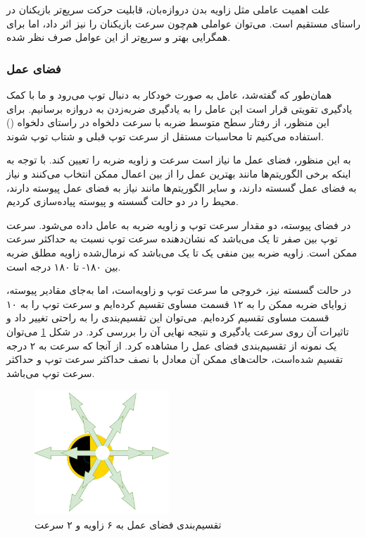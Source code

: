 علت اهمیت عاملی مثل زاویه بدن دروازه‌بان، قابلیت حرکت سریع‌تر بازیکنان در راستای مستقیم است. می‌توان عواملی هم‌چون سرعت بازیکنان را نیز اثر داد،
اما برای همگرایی بهتر و سریع‌تر از این عوامل صرف نظر شده.
\subsubsection{فضای عمل}
همان‌طور که گفته‌شد، عامل به صورت خودکار به دنبال توپ می‌رود و ما با کمک یادگیری تقویتی قرار است این عامل را به یادگیری ضربه‌زدن به دروازه برسانیم.
برای این منظور، از رفتار سطح متوسط ضربه با سرعت دلخواه در راستای دلخواه ()
 استفاده می‌کنیم تا محاسبات مستقل از سرعت توپ قبلی و شتاب توپ شوند.

 به این منظور، فضای عمل ما نیاز است سرعت و زاویه ضربه را تعیین کند.
 با توجه به اینکه برخی الگوریتم‌ها مانند  بهترین عمل را از بین اعمال ممکن انتخاب می‌کنند و نیاز به فضای عمل گسسته دارند،
و سایر الگوریتم‌ها مانند  نیاز به فضای عمل پیوسته دارند،
محیط را در دو حالت گسسته و پیوسته پیاده‌سازی کردیم.

در فضای پیوسته، دو مقدار سرعت توپ و زاویه ضربه به عامل داده می‌شود.
سرعت توپ بین صفر تا یک می‌باشد که نشان‌دهنده سرعت توپ نسبت به حداکثر سرعت ممکن است.
زاویه ضربه بین منفی یک تا یک می‌باشد که نرمال‌شده زاویه مطلق ضربه بین ۱۸۰- تا ۱۸۰ درجه است.

در حالت گسسته نیز، خروجی ما سرعت توپ و زاویه‌است، اما به‌جای مقادیر پیوسته، زوایای ضربه ممکن را به ۱۲ قسمت مساوی تقسیم کرده‌ایم و سرعت توپ را به ۱۰ قسمت مساوی تقسیم کرده‌ایم.
می‌توان این تقسیم‌بندی را به راحتی تغییر داد و تاثیرات آن روی سرعت یادگیری و نتیجه نهایی آن را بررسی کرد.
در شکل \ref{fig:discretization} می‌توان یک نمونه از تقسیم‌بندی فضای عمل را مشاهده کرد.
از آنجا که سرعت به ۲ درجه تقسیم شده‌است، حالت‌های ممکن آن معادل با نصف حداکثر سرعت توپ و حداکثر سرعت توپ می‌باشد.
\begin{figure}[H]
    \centering
    \includegraphics[width=0.45\textwidth]{images/discretization.drawio.png}
    \caption{تقسیم‌بندی فضای عمل به ۶ زاویه و ۲ سرعت}\label{fig:discretization}
\end{figure}
